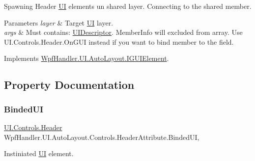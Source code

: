 Spawning Header \mbox{\hyperlink{namespace_wpf_handler_1_1_u_i}{UI}} elements un shared layer. Connecting to the shared member. 


\begin{DoxyParams}{Parameters}
{\em layer} & Target \mbox{\hyperlink{namespace_wpf_handler_1_1_u_i}{UI}} layer.\\
\hline
{\em args} & Must contains\+: \mbox{\hyperlink{class_wpf_handler_1_1_u_i_1_1_auto_layout_1_1_u_i_descriptor}{U\+I\+Descriptor}}. Member\+Info will excluded from array. Use U\+I.\+Controls.\+Header.\+On\+G\+UI instead if you want to bind member to the field.\\
\hline
\end{DoxyParams}


Implements \mbox{\hyperlink{interface_wpf_handler_1_1_u_i_1_1_auto_layout_1_1_i_g_u_i_element_a0ff16956f8e8187d51e1b36b6b9f894e}{Wpf\+Handler.\+U\+I.\+Auto\+Layout.\+I\+G\+U\+I\+Element}}.



\subsection{Property Documentation}
\mbox{\label{class_wpf_handler_1_1_u_i_1_1_auto_layout_1_1_controls_1_1_header_attribute_a27af4560ad16335bf2c210692949c1c5}} 
\subsubsection{\texorpdfstring{Binded\+UI}{BindedUI}}
{\footnotesize\ttfamily \mbox{\hyperlink{class_wpf_handler_1_1_u_i_1_1_controls_1_1_header}{U\+I.\+Controls.\+Header}} Wpf\+Handler.\+U\+I.\+Auto\+Layout.\+Controls.\+Header\+Attribute.\+Binded\+UI\hspace{0.3cm}{\ttfamily [get]}, {}}



Instiniated \mbox{\hyperlink{namespace_wpf_handler_1_1_u_i}{UI}} element. 

\mbox{\label{class_wpf_handler_1_1_u_i_1_1_auto_layout_1_1_controls_1_1_header_attribute_a37e39441398bd5aa132da26eb23e9349}} 
